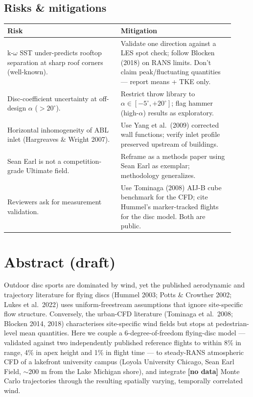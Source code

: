 \documentclass[11pt,letterpaper]{article}
\newcommand{\MISSINGNUM}{\textbf{\color{red}[no data]}}%
\newcommand{\NtotalThrows}{\MISSINGNUM}\newcommand{\NthrowsPerCell}{\MISSINGNUM}%
\begin{document}
\subsection{Risks \& mitigations}

\begin{center}
\footnotesize
\begin{tabular}{@{}p{0.46\linewidth}p{0.46\linewidth}@{}}
\toprule
\textbf{Risk} & \textbf{Mitigation} \\
\midrule
k-$\omega$ SST under-predicts rooftop separation at sharp roof corners (well-known). & Validate one direction against a LES spot check; follow Blocken (2018) on RANS limits. Don't claim peak/fluctuating quantities --- report means + TKE only. \\
Disc-coefficient uncertainty at off-design $\alpha$ ($>20^\circ$). & Restrict throw library to $\alpha \in [-5^\circ, +20^\circ]$; flag hammer (high-$\alpha$) results as exploratory. \\
Horizontal inhomogeneity of ABL inlet (Hargreaves \& Wright 2007). & Use Yang et al.\ (2009) corrected wall functions; verify inlet profile preserved upstream of buildings. \\
Sean Earl is not a competition-grade Ultimate field. & Reframe as a methods paper using Sean Earl as exemplar; methodology generalizes. \\
Reviewers ask for measurement validation. & Use Tominaga (2008) AIJ-B cube benchmark for the CFD; cite Hummel's marker-tracked flights for the disc model. Both are public. \\
\bottomrule
\end{tabular}
\end{center}

\section{Abstract (draft)}
\label{sec:abstract}

Outdoor disc sports are dominated by wind, yet the published aerodynamic and
trajectory literature for flying discs (Hummel 2003; Potts \& Crowther 2002;
Lukes et al.\ 2022) uses uniform-freestream assumptions that ignore
site-specific flow structure. Conversely, the urban-CFD literature (Tominaga et
al.\ 2008; Blocken 2014, 2018) characterises site-specific wind fields but stops
at pedestrian-level mean quantities. Here we couple a 6-degree-of-freedom
flying-disc model --- validated against two independently published reference
flights to within 8\% in range, 4\% in apex height and 1\% in flight time --- to
steady-RANS atmospheric CFD of a lakefront university campus (Loyola University
Chicago, Sean Earl Field, $\sim$200 m from the Lake Michigan shore), and
integrate \NtotalThrows{} Monte Carlo trajectories through the resulting
spatially varying, temporally correlated wind.
\end{document}
